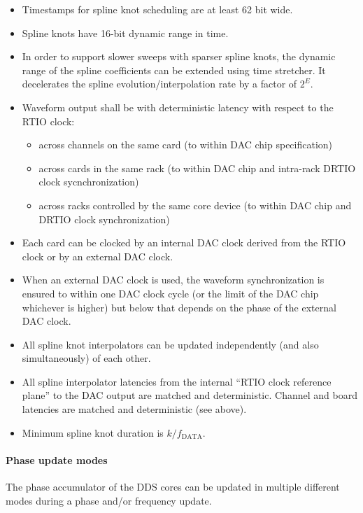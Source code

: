 \documentclass[11pt]{paper}
\begin{document}
\begin{itemize}
	\item Timestamps for spline knot scheduling are at least 62 bit wide.
	\item Spline knots have 16-bit dynamic range in time.
	\item In order to support slower sweeps with sparser spline knots, the dynamic range of the spline coefficients can be extended using time stretcher.
		It decelerates the spline evolution/interpolation rate by a factor of $2^E$.
	\item Waveform output shall be with deterministic latency with respect to the RTIO clock:
		\begin{itemize}
			\item across channels on the same card (to within DAC
				chip specification)
			\item across cards in the same rack (to within DAC chip
				and intra-rack DRTIO clock sycnchronization)
			\item across racks controlled by the same core device
				(to within DAC chip and DRTIO clock synchronization)
		\end{itemize}
	\item Each card can be clocked by an internal DAC clock derived from the RTIO clock or by an external DAC clock.
	\item When an external DAC clock is used, the waveform synchronization is ensured to within one DAC clock cycle (or the limit of the DAC chip whichever is higher) but below that depends on the phase of the external DAC clock.
	\item All spline knot interpolators can be updated independently (and also simultaneously) of each other.
	\item All spline interpolator latencies from the internal ``RTIO clock reference plane'' to the DAC output are matched and deterministic.
		Channel and board latencies are matched and deterministic (see above).
	\item Minimum spline knot duration is $k/f_\mathrm{DATA}$. 
\end{itemize}

\paragraph{Phase update modes}

The phase accumulator of the DDS cores can be updated in multiple different modes during a phase and/or frequency update.
\end{document}
